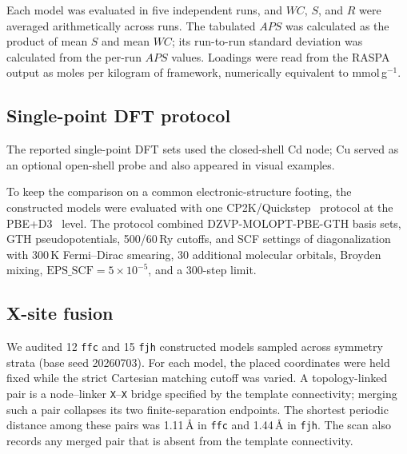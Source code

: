 \documentclass[a5paper, 10pt]{article}
\begin{document}
Each model was evaluated in five independent runs, and $WC$, $S$, and $R$ were averaged arithmetically across runs. The tabulated $APS$ was calculated as the product of mean $S$ and mean $WC$; its run-to-run standard deviation was calculated from the per-run $APS$ values. Loadings were read from the RASPA output as moles per kilogram of framework, numerically equivalent to mmol\,g$^{-1}$.

\subsection{Single-point DFT protocol}
\label{app:dft_screening}

The reported single-point DFT sets used the closed-shell Cd node; Cu served as an optional open-shell probe and also appeared in visual examples.

To keep the comparison on a common electronic-structure footing, the constructed models were evaluated with one CP2K/Quickstep~\cite{cp2k2020} protocol at the PBE+D3~\cite{perdew1996pbe,grimme2010d3} level. The protocol combined DZVP-MOLOPT-PBE-GTH basis sets, GTH pseudopotentials, 500/60\,Ry cutoffs, and SCF settings of diagonalization with 300\,K Fermi--Dirac smearing, 30 additional molecular orbitals, Broyden mixing, $\mathrm{EPS\_SCF}=5\times10^{-5}$, and a 300-step limit.

\subsection{X-site fusion}
\label{app:x_fusion}

We audited 12 \texttt{ffc} and 15 \texttt{fjh} constructed models sampled across symmetry strata (base seed 20260703). For each model, the placed coordinates were held fixed while the strict Cartesian matching cutoff was varied. A topology-linked pair is a node--linker \texttt{X}--\texttt{X} bridge specified by the template connectivity; merging such a pair collapses its two finite-separation endpoints. The shortest periodic distance among these pairs was 1.11\,\AA{} in \texttt{ffc} and 1.44\,\AA{} in \texttt{fjh}. The scan also records any merged pair that is absent from the template connectivity.
\end{document}
